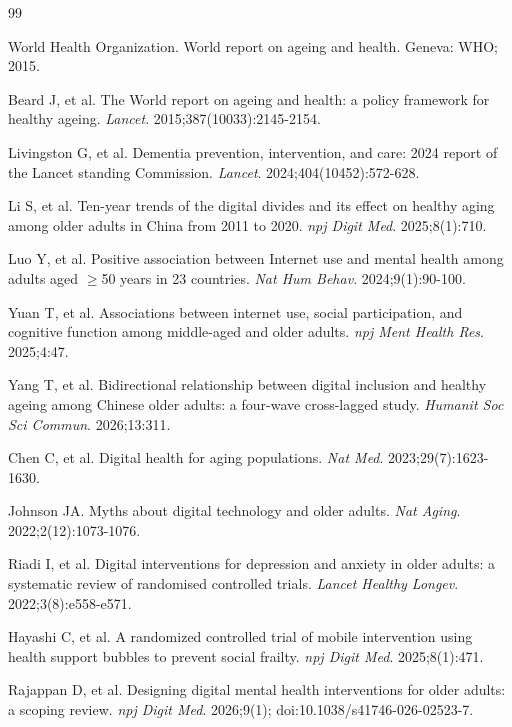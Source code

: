 \documentclass[10pt]{article}
\begin{document}
\begin{thebibliography}{99}

World Health Organization. World report on ageing and health. Geneva: WHO; 2015.

Beard J, et al. The World report on ageing and health: a policy framework for healthy ageing. \textit{Lancet}. 2015;387(10033):2145-2154.

Livingston G, et al. Dementia prevention, intervention, and care: 2024 report of the Lancet standing Commission. \textit{Lancet}. 2024;404(10452):572-628.

Li S, et al. Ten-year trends of the digital divides and its effect on healthy aging among older adults in China from 2011 to 2020. \textit{npj Digit Med}. 2025;8(1):710.

Luo Y, et al. Positive association between Internet use and mental health among adults aged $\geq$50 years in 23 countries. \textit{Nat Hum Behav}. 2024;9(1):90-100.

Yuan T, et al. Associations between internet use, social participation, and cognitive function among middle-aged and older adults. \textit{npj Ment Health Res}. 2025;4:47.

Yang T, et al. Bidirectional relationship between digital inclusion and healthy ageing among Chinese older adults: a four-wave cross-lagged study. \textit{Humanit Soc Sci Commun}. 2026;13:311.

Chen C, et al. Digital health for aging populations. \textit{Nat Med}. 2023;29(7):1623-1630.

Johnson JA. Myths about digital technology and older adults. \textit{Nat Aging}. 2022;2(12):1073-1076.

Riadi I, et al. Digital interventions for depression and anxiety in older adults: a systematic review of randomised controlled trials. \textit{Lancet Healthy Longev}. 2022;3(8):e558-e571.

Hayashi C, et al. A randomized controlled trial of mobile intervention using health support bubbles to prevent social frailty. \textit{npj Digit Med}. 2025;8(1):471.

Rajappan D, et al. Designing digital mental health interventions for older adults: a scoping review. \textit{npj Digit Med}. 2026;9(1); doi:10.1038/s41746-026-02523-7.


\end{thebibliography}
\end{document}
